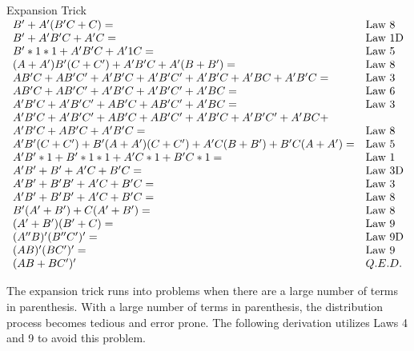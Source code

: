 \begin{process}{Expansion Trick}
$
\begin{array}[ht]{ll}
B' + A'(B'C + C) =                                    & \text{Law 8} \\
B' + A'B'C + A'C =                                 & \text{Law 1D} \\
B'*1*1 + A'B'C + A'1C =                             & \text{Law 5} \\
(A+A')B'(C+C') + A'B'C + A'(B+B') =                        & \text{Law 8} \\
AB'C + AB'C' + A'B'C + A'B'C' + A'B'C + A'BC + A'B'C =         & \text{Law 3} \\
AB'C + AB'C' + A'B'C + A'B'C' + A'BC =                    & \text{Law 6} \\
A'B'C + A'B'C' + AB'C + AB'C' + A'BC =                    & \text{Law 3} \\
A'B'C + A'B'C' + AB'C + AB'C' + A'B'C + A'B'C' + A'BC +         &                \\
A'B'C + AB'C + A'B'C =                                 & \text{Law 8} \\
A'B'(C+C') + B'(A + A')(C + C') + A'C(B+B') + B'C(A+A') =        & \text{Law 5} \\
A'B'*1 + B'*1*1 + A'C*1 + B'C*1 =                        & \text{Law 1} \\
A'B' + B' + A'C + B'C =                                & \text{Law 3D} \\
A'B' + B'B' + A'C + B'C =                            & \text{Law 3} \\
A'B' + B'B' + A'C + B'C =                            & \text{Law 8} \\
B'(A' + B') + C(A' + B') =                             & \text{Law 8} \\
(A' + B')(B' + C) =                                    & \text{Law 9} \\
(A''B)'(B''C')' =                                     & \text{Law 9D} \\
(AB)'(BC')' =                                     & \text{Law 9} \\
(AB + BC')'        & Q.E.D. \\
\end{array}$

\end{process}

The expansion trick runs into problems when there are a large
number of terms in parenthesis.  With a large number
of terms in parenthesis, the distribution process becomes tedious
and error prone. The following derivation utilizes Laws
4 and 9 to avoid this problem.

